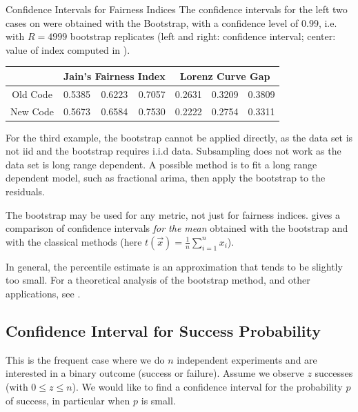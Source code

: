 \begin{ex}{Confidence Intervals for Fairness Indices} The confidence
intervals for the left two cases on
 were obtained with the
Bootstrap, with a confidence level of $0.99$,
i.e. with $R=4999$ bootstrap replicates (left and
right: confidence interval; center: value of
index computed in ).
 \begin{center}
\begin{tabular}{|c|lcr|lcr|}
  \hline
   &
   \multicolumn{3}{c|}{Jain's Fairness Index}
   &
   \multicolumn{3}{c|}{Lorenz Curve Gap}
   \\ \hline \hline
  Old Code & 0.5385  &  0.6223  &  0.7057 &  0.2631  &  0.3209  &  0.3809  \\
  New Code & 0.5673 &   0.6584 &   0.7530 &0.2222  &  0.2754  &  0.3311   \\
 \hline
\end{tabular}
\end{center}
For the third example, the bootstrap cannot be applied
directly, as the data set is not iid and the bootstrap requires
i.i.d data. Subsampling does not work as the data set is long
range dependent. A possible method is to fit a long range
dependent model, such as fractional arima, then apply the
bootstrap to the residuals.
\end{ex}

The bootstrap may be used for any metric, not just for fairness
indices.  gives a comparison of confidence
intervals \emph{for the mean} obtained with the bootstrap and
with the classical methods (here
$t(\vec{x})=\frac{1}{n}\sum_{i=1}^n x_i$).

In general, the percentile estimate is an approximation that
tends to be slightly too small. For a theoretical analysis of
the bootstrap method, and other applications, see
\cite{davison1997bootstrap}.


\subsection{Confidence Interval for Success Probability}
This is the frequent case where we do $n$ independent
experiments and are interested in a binary outcome (success or
failure). Assume we observe $z$ successes (with $0\leq z \leq
n$). We would like to find a confidence interval for the
probability $p$ of success, in particular when $p$ is small.

